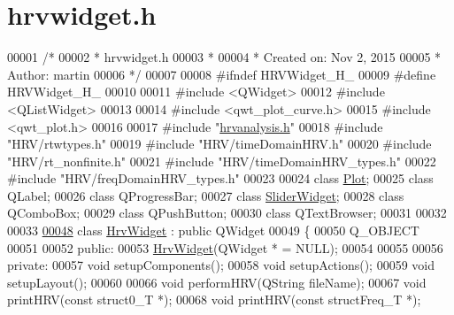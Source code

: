 \hypertarget{hrvwidget_8h_source}{}\section{hrvwidget.\+h}
\label{hrvwidget_8h_source}

\begin{DoxyCode}
00001 \textcolor{comment}{/*}
00002 \textcolor{comment}{ * hrvwidget.h}
00003 \textcolor{comment}{ *}
00004 \textcolor{comment}{ *  Created on: Nov 2, 2015}
00005 \textcolor{comment}{ *      Author: martin}
00006 \textcolor{comment}{ */}
00007 
00008 \textcolor{preprocessor}{#ifndef HRVWidget\_H\_}
00009 \textcolor{preprocessor}{#define HRVWidget\_H\_}
00010 
00011 \textcolor{preprocessor}{#include <QWidget>}
00012 \textcolor{preprocessor}{#include <QListWidget>}
00013 
00014 \textcolor{preprocessor}{#include <qwt\_plot\_curve.h>}
00015 \textcolor{preprocessor}{#include <qwt\_plot.h>}
00016 
00017 \textcolor{preprocessor}{#include "\hyperlink{hrvanalysis_8h}{hrvanalysis.h}"}
00018 \textcolor{preprocessor}{#include "HRV/rtwtypes.h"}
00019 \textcolor{preprocessor}{#include "HRV/timeDomainHRV.h"}
00020 \textcolor{preprocessor}{#include "HRV/rt\_nonfinite.h"}
00021 \textcolor{preprocessor}{#include "HRV/timeDomainHRV\_types.h"}
00022 \textcolor{preprocessor}{#include "HRV/freqDomainHRV\_types.h"}
00023 
00024 \textcolor{keyword}{class }\hyperlink{classPlot}{Plot};
00025 \textcolor{keyword}{class }QLabel;
00026 \textcolor{keyword}{class }QProgressBar;
00027 \textcolor{keyword}{class }\hyperlink{classSliderWidget}{SliderWidget};
00028 \textcolor{keyword}{class }QComboBox;
00029 \textcolor{keyword}{class }QPushButton;
00030 \textcolor{keyword}{class }QTextBrowser;
00031 
00032 
00033 
\hypertarget{hrvwidget_8h_source.tex_l00048}{}\hyperlink{classHrvWidget}{00048} \textcolor{keyword}{class }\hyperlink{classHrvWidget}{HrvWidget} : \textcolor{keyword}{public} QWidget
00049 \{
00050     Q\_OBJECT
00051 
00052 \textcolor{keyword}{public}:
00053     \hyperlink{classHrvWidget_adfd3a1b7a3c35e4380208cbe8d620c88}{HrvWidget}(QWidget * = NULL);
00054 
00055 
00056 \textcolor{keyword}{private}:
00057     \textcolor{keywordtype}{void} setupComponents();  
00058     \textcolor{keywordtype}{void} setupActions(); 
00059     \textcolor{keywordtype}{void} setupLayout();
00060 
00066     \textcolor{keywordtype}{void} performHRV(QString fileName);
00067     \textcolor{keywordtype}{void} printHRV(\textcolor{keyword}{const} struct0\_T *); 
00068     \textcolor{keywordtype}{void} printHRV(\textcolor{keyword}{const} structFreq\_T *); 

\end{DoxyCode}
